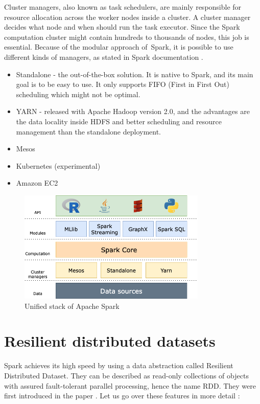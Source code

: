 Cluster managers, also known as task schedulers, are mainly responsible for resource allocation across the worker nodes inside a cluster. A cluster manager decides what node and when should run the task executor. Since the Spark computation cluster might contain hundreds to thousands of nodes, this job is essential. Because of the modular approach of~Spark, it is possible to use different kinds of managers, as stated in Spark documentation \cite{spark-doc}.
\begin{itemize}
\item Standalone - the out-of-the-box solution. It is native to Spark, and its main goal is to be easy to use. It only supports FIFO (First in First Out) scheduling which might not be optimal.
\item YARN  - released with Apache Hadoop version 2.0, and  
the advantages are the data locality inside HDFS and better scheduling and resource management than the standalone deployment.
\item Mesos 
\item Kubernetes (experimental)
\item Amazon EC2
\end{itemize}


\begin{figure}[H]
\centering
\label{fig:ecosystem}
\includegraphics[width=0.8\textwidth]{obrazky-figures/ecosystem.drawio.png}
\caption{Unified stack of Apache Spark}
\end{figure}


\label{sec:rdd}
\section{Resilient distributed datasets }

Spark achieves its high speed by using a data abstraction called Resilient Distributed Dataset. They can be described as read-only collections of objects with assured fault-tolerant parallel processing, hence the name RDD. They were first introduced in the paper \cite{rdds}. 
Let us go over these features in more detail \cite{githubbook}:


